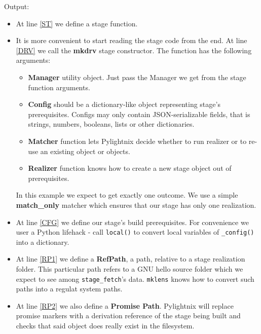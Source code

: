 Output:

\mysmallstdout

\begin{itemize}
  \item At line \ref{ST} we define a stage function.

  \item It is more convenient to start reading the stage code from the end.  At
    line \ref{DRV} we call the \textbf{mkdrv} stage constructor. The function
    has the following arguments:

    \begin{itemize}

      \item \textbf{Manager} utility object. Just pass the Manager we get from
        the stage function arguments.

      \item \textbf{Config} should be a dictionary-like object representing
        stage's prerequisites. Configs may only contain JSON-serializable
        fields, that is strings, numbers, booleans, lists or other dictionaries.

      \item \textbf{Matcher} function lets Pylightnix decide whether to run
        realizer or to re-use an existing object or objects.

      \item \textbf{Realizer} function knows how to create a new stage object
        out of prerequisites.

    \end{itemize}

    In this example we expect to get exactly one outcome. We use a simple
    \textbf{match\_only} matcher which ensures that our stage has only one
    realization.

  \item At line \ref{CFG} we define our stage's build prerequisites. For
    convenience we user a Python lifehack - call \texttt{local()} to convert
    local variables of \texttt{\_config()} into a dictionary.

  \item At line \ref{RP1} we define a \textbf{RefPath}, a path, relative to a
    stage realization folder. This particular path refers to a GNU hello source
    folder which we expect to see among \texttt{stage\_fetch}'s data.
    \texttt{mklens} knows how to convert such paths into a regulat system paths.

  \item At line \ref{RP2} we also define a \textbf{Promise Path}. Pylightnix
    will replace promise markers with a derivation reference of the stage
    being built and checks that said object does really exist in the filesystem.


\end{itemize}
